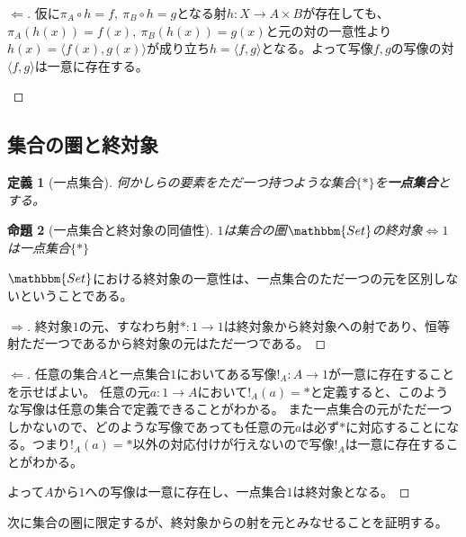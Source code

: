 \documentclass[uplatex,dvipdfmx]{jsarticle}
\newcommand{\cat}[1]{\mathbbm{#1}}
\newcommand{\arrow}{\rightarrow}
\newcommand{\tuple}[1]{\langle #1\rangle}
\newcommand{\mor}[3]{#1:#2\arrow #3}
\newtheorem{proof}{証明}[section]
\newtheorem{prop}[proof]{命題}
\newtheorem{define}[proof]{定義}
\numberwithin{proof}{subsection}
\begin{document}
\begin{proof}[$\Longleftarrow$]
		仮に$\pi_A\circ h=f,\ \pi_B\circ h=g$となる射$\mor{h}{X}{A\times B}$が存在しても、
		$\pi_A(h(x))=f(x),\ \pi_B(h(x))=g(x)$と元の対の一意性より$h(x)=\tuple{f(x),g(x)}$が成り立ち$h=\tuple{f,g}$となる。よって写像$f,g$の写像の対$\tuple{f,g}$は一意に存在する。
		\begin{center}
		\end{center}
	\end{proof}
	
  \subsection{集合の圏と終対象}
	\begin{define}[一点集合]
		何かしらの要素をただ一つ持つような集合$\{*\}$を\textbf{一点集合}とする。
	\end{define}
	\begin{prop}[一点集合と終対象の同値性]
		$1$は集合の圏$\cat{Set}$の終対象$\iff 1$は一点集合$\{*\}$
	\end{prop}
  $\cat{Set}$における終対象の一意性は、一点集合のただ一つの元を区別しないということである。
	\begin{proof}[$\Longrightarrow$]
		終対象$1$の元、すなわち射$\mor{*}{1}{1}$は終対象から終対象への射であり、恒等射ただ一つであるから終対象の元はただ一つである。
	\end{proof}
	\begin{proof}[$\Longleftarrow$]
		任意の集合$A$と一点集合$1$においてある写像$\mor{!_A}{A}{1}$が一意に存在することを示せばよい。
		任意の元$\mor{a}{1}{A}$において$!_A(a)=*$と定義すると、このような写像は任意の集合で定義できることがわかる。
		また一点集合の元がただ一つしかないので、どのような写像であっても任意の元$a$は必ず$*$に対応することになる。つまり$!_A(a)=*$以外の対応付けが行えないので写像$!_A$は一意に存在することがわかる。

		よって$A$から$1$への写像は一意に存在し、一点集合$1$は終対象となる。
	\end{proof}
	次に集合の圏に限定するが、終対象からの射を元とみなせることを証明する。
\end{document}
